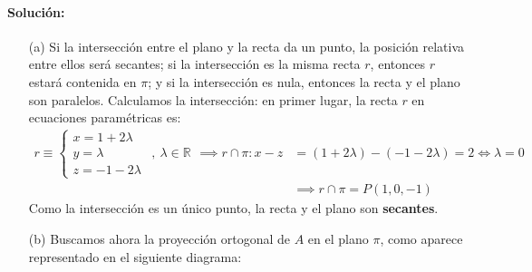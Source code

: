 \paragraph{Solución:}
\begin{enumerate}
    \item[(a)] Si la intersección entre el plano y la recta da un punto, la posición relativa entre ellos será secantes; si la intersección es la misma recta $r$, entonces $r$ estará contenida en $\pi$; y si la intersección es nula, entonces la recta y el plano son paralelos. Calculamos la intersección: en primer lugar, la recta $r$ en ecuaciones paramétricas es:
    \begin{equation*}
        \begin{split}
        r\equiv \begin{cases}
            x=1+2\lambda& \\
            y=\lambda &,\  \lambda \in \mathbb{R}\\
            z=-1-2\lambda 
            \end{cases}\implies r\cap \pi: x-z&=(1+2\lambda )-(-1-2\lambda )=2\iff \lambda =0 \\
            &\implies \boxed{r\cap \pi =P(1,0,-1)}            
        \end{split}
    \end{equation*}
    Como la intersección es un único punto, la recta y el plano son \textbf{secantes}.

    \item[(b)] Buscamos ahora la proyección ortogonal de $A$ en el plano $\pi$, como aparece representado en el siguiente diagrama:
    

\end{enumerate}
